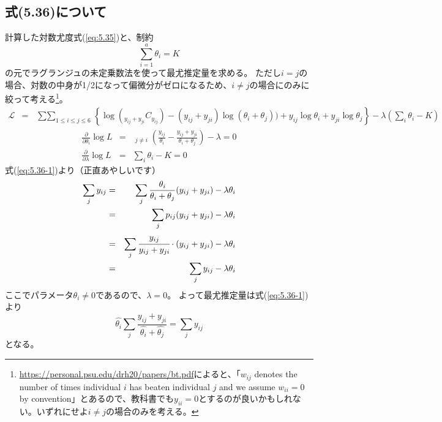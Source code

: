 \documentclass[10pt, a4paper]{ltjsarticle}
\newcommand\refeq[1]{式(\ref{#1})}
\begin{document}
\subsection{式(5.36)について}
計算した対数尤度\refeq{eq:5.35}と、制約
\begin{equation}
  \sum_{i=1}^a \theta_i = K \label{eq:5.37}
\end{equation}
の元でラグランジュの未定乗数法を使って最尤推定量を求める。
ただし$i=j$の場合、対数の中身が1/2になって偏微分がゼロになるため、$i \neq j$の場合にのみに絞って考える\footnote{\url{https://personal.psu.edu/drh20/papers/bt.pdf}によると、「$w_{ij}$ denotes the number of times individual $i$ has beaten individual $j$ and we assume $w_{ii} = 0$ by convention」とあるので、教科書でも$y_{ii}=0$とするのが良いかもしれない。いずれにせよ$i\neq j$の場合のみを考える。}。
\begin{eqnarray}
  \mathcal{L} &=& \mathop{\sum\sum}_{1\leq i \leq j \leq 6} 
    \left\{ \log({}_{y_{ij}+y_{ji}}C_{y_{ij}}) -(y_{ij}+y_{ji})\log(\theta_i+\theta_j)) + y_{ij}\log\theta_i + y_{ji}\log\theta_j \right\} - \lambda \left(\sum_i\theta_i -K\right)
\end{eqnarray}
\begin{eqnarray}
  \frac{\partial}{\partial\theta_i} \log L &=& \mathop{\sum_{j}}_{j\neq i} \left( \frac{y_{ij}}{\theta_i} - \frac{y_{ij}+y_{ji}}{\theta_i + \theta_j} \right) - \lambda = 0 \label{eq:5.36-1}\\
  \frac{\partial}{\partial\lambda} \log L &=& \sum_i\theta_i -K = 0 \label{eq:5.36-2}
\end{eqnarray}
\refeq{eq:5.36-1}より（正直あやしいです）
\begin{eqnarray}
  \sum_j y_{ij} &=& \sum_j\frac{\theta_i}{\theta_i + \theta_j}(y_{ij}+y_{ji}) - \lambda\theta_i \\
  &=& \sum_j p_{ij}(y_{ij}+y_{ji}) - \lambda\theta_i \\
  &=& \sum_j \cfrac{y_{ij}}{y_{ij}+y_{ji}}\cdot(y_{ij}+y_{ji}) - \lambda\theta_i \\
  &=& \sum_j y_{ij} - \lambda\theta_i
\end{eqnarray}
ここでパラメータ$\theta_i\neq 0$であるので、$\lambda=0$。
よって最尤推定量は\refeq{eq:5.36-1}より
\begin{equation}
  \hat{\theta_i}\sum_j\frac{y_{ij}+y_{ji}}{\hat{\theta_i} + \hat{\theta_j}} = \sum_j y_{ij} \label{eq:5.36-2}
\end{equation}
となる。


\end{document}
